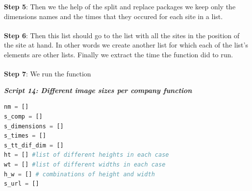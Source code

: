 \documentclass{article}
\begin{document}
\textbf{Step 5}: Then we the help of the split and replace packages we keep only the dimensions names and the times that they occured for each site in a list.\\\\
\textbf{Step 6}: Then this list should go to the list with all the sites in the position of the site at hand. In other words we create another list for which each of the list's elements are other lists. Finally we extract the time the function did to run.\\\\
\textbf{Step 7}: We run the function
\begin{center}
\textit{\textbf{Script 14: Different image sizes per company function}}
\end{center}
\begin{lstlisting}[language=Python]
nm = []
s_comp = []
s_dimensions = []
s_times = []
s_tt_dif_dim = []
ht = [] #list of different heights in each case
wt = [] #list of different widths in each case
h_w = [] # combinations of height and width
s_url = []


\end{lstlisting}
\end{document}
